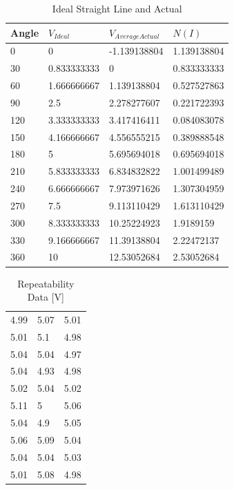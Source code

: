 \documentclass[a4,11pt]{article}
\begin{document}
\begin{table}[H]
	\centering
	\caption{Ideal Straight Line and Actual}
	\label{idealandact}
	\begin{tabular}{l|l|l|l}
		Angle  &  $V_{Ideal}$  &  $V_{Average Actual}$  &  $N(I)$  \\  \hline
		0  &  0  &  -1.139138804  &  1.139138804  \\
		30  &  0.833333333  &  0  &  0.833333333  \\
		60  &  1.666666667  &  1.139138804  &  0.527527863  \\
		90  &  2.5  &  2.278277607  &  0.221722393  \\
		120  &  3.333333333  &  3.417416411  &  0.084083078  \\
		150  &  4.166666667  &  4.556555215  &  0.389888548  \\
		180  &  5  &  5.695694018  &  0.695694018  \\
		210  &  5.833333333  &  6.834832822  &  1.001499489  \\
		240  &  6.666666667  &  7.973971626  &  1.307304959  \\
		270  &  7.5  &  9.113110429  &  1.613110429  \\
		300  &  8.333333333  &  10.25224923  &  1.9189159  \\
		330  &  9.166666667  &  11.39138804  &  2.22472137  \\
		360  &  10  &  12.53052684  &  2.53052684  \\
	\end{tabular}
\end{table}

\begin{table}[H]
	\centering
	\caption{Repeatability Data [V]}
	\label{repeat}
	\begin{tabular}{l|l|l}
		4.99  &  5.07  &  5.01  \\
		5.01  &  5.1  &  4.98  \\
		5.04  &  5.04  &  4.97  \\
		5.04  &  4.93  &  4.98  \\
		5.02  &  5.04  &  5.02  \\
		5.11  &  5  &  5.06  \\
		5.04  &  4.9  &  5.05  \\
		5.06  &  5.09  &  5.04  \\
		5.04  &  5.04  &  5.03  \\
		5.01  &  5.08  &  4.98  \\
	\end{tabular}
\end{table}
\end{document}
